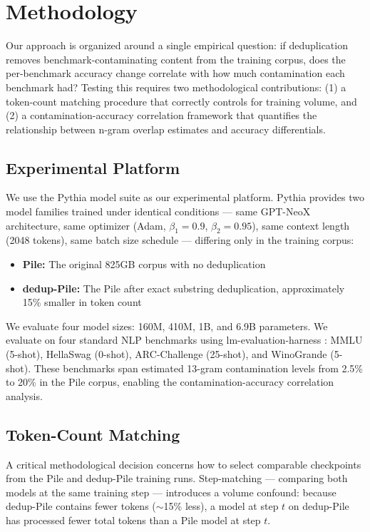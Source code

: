 \section{Methodology}
\label{sec:methodology}

Our approach is organized around a single empirical question: if deduplication removes
benchmark-contaminating content from the training corpus, does the per-benchmark accuracy
change correlate with how much contamination each benchmark had? Testing this requires
two methodological contributions: (1) a token-count matching procedure that correctly
controls for training volume, and (2) a contamination-accuracy correlation framework
that quantifies the relationship between n-gram overlap estimates and accuracy differentials.

\subsection{Experimental Platform}

We use the Pythia model suite \citep{Biderman2023Pythia} as our experimental platform.
Pythia provides two model families trained under identical conditions --- same GPT-NeoX
architecture, same optimizer (Adam, $\beta_1=0.9$, $\beta_2=0.95$), same context length
(2048 tokens), same batch size schedule --- differing only in the training corpus:

\begin{itemize}
\item \textbf{Pile:} The original 825GB corpus with no deduplication \citep{Gao2020Pile}
\item \textbf{dedup-Pile:} The Pile after exact substring deduplication, approximately 15\% smaller in token count
\end{itemize}

We evaluate four model sizes: 160M, 410M, 1B, and 6.9B parameters. We evaluate on four
standard NLP benchmarks using lm-evaluation-harness \citep{EleutherAI2023Harness}: MMLU (5-shot),
HellaSwag (0-shot), ARC-Challenge (25-shot), and WinoGrande (5-shot). These benchmarks
span estimated 13-gram contamination levels from 2.5\% to 20\% in the Pile corpus,
enabling the contamination-accuracy correlation analysis.

\subsection{Token-Count Matching}

A critical methodological decision concerns how to select comparable checkpoints from
the Pile and dedup-Pile training runs. Step-matching --- comparing both models at the
same training step --- introduces a volume confound: because dedup-Pile contains fewer
tokens ($\sim$15\% less), a model at step $t$ on dedup-Pile has processed fewer total
tokens than a Pile model at step $t$.

